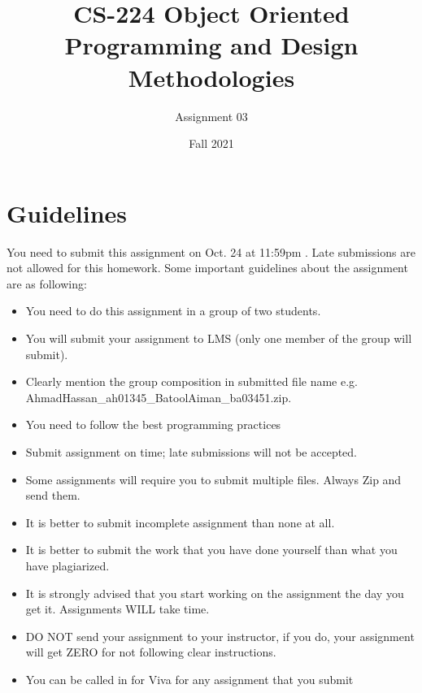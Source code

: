 \documentclass[a4paper,12pt]{article}
\begin{document}
	
	\title{CS-224 Object Oriented Programming and Design Methodologies }
	\author{Assignment 03}
	\date{Fall 2021}
	\maketitle
	\section{Guidelines}
	You need to submit this assignment on  {\color{red}Oct. 24 at 11:59pm }. Late submissions are not allowed for this homework.
	Some important guidelines about the assignment are as following:
	
	\begin{itemize}
		\item You need to do this assignment in a group of two students.
		\item You will submit your assignment to LMS (only one member of the group will submit).
		\item Clearly mention the group composition in submitted file name e.g. AhmadHassan\_ah01345\_BatoolAiman\_ba03451.zip. 
		\item You need to follow the best programming practices 
		\item Submit assignment on time; late submissions will not be accepted.
		\item Some assignments will require you to submit multiple files. Always Zip and send them.
		\item It is better to submit incomplete assignment than none at all.
		\item It is better to submit the work that you have done yourself than what you have plagiarized.
		\item It is strongly advised that you start working on the assignment the day you get it. Assignments WILL take time.
		\item DO NOT send your assignment to your instructor, if you do, your assignment will get ZERO for not following clear instructions.
		\item You can be called in for Viva for any assignment that you submit
	\end{itemize}
	

	
\end{document}
